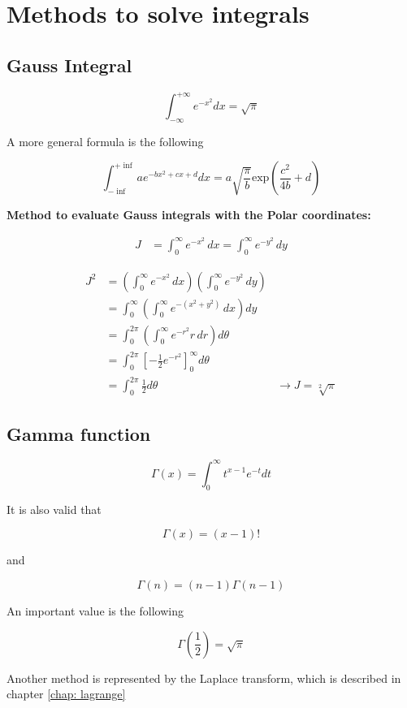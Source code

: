 \section{Methods to solve integrals}

\subsection{Gauss Integral}

\begin{equation}
    \int_{- \infty}^{+ \infty}{e^{-x^2} dx} = \sqrt{\pi}
\end{equation}

A more general formula is the following

\begin{equation}
    \int_{-\inf}^{+\inf}{a e^{-b x^2 + cx + d} dx} = a \sqrt{\frac{\pi}{b}} \text{exp}\left(\frac{c^2}{4b} + d \right)
\end{equation}

\textbf{Method to evaluate Gauss integrals with the Polar coordinates:}

\begin{align*}
    J &= \int_0^\infty e^{-x^2} \, dx = \int_0^\infty e^{-y^2} \, dy
\end{align*}

\begin{align*}
    J^2 &= \left(\int_0^\infty e^{-x^2} \, dx\right) \left(\int_0^\infty e^{-y^2} \, dy\right) \\
        &= \int_0^\infty \left(\int_0^\infty e^{-(x^2 + y^2)} \, dx\right) dy \\
        &= \int_0^{2\pi} \left(\int_0^\infty e^{-r^2} r \, dr\right) d\theta \\
        &= \int_0^{2 \pi}{[-\frac{1}{2} e^{-r^2}]_0^\infty d\theta} \\
        &= \int_0^{2 \pi}{\frac{1}{2} d\theta}
        &\rightarrow J = \sqrt[2]{\pi}
\end{align*}

\subsection{Gamma function}

\[
  \Gamma(x) = \int_0^\infty{t^{x-1} e^{-t} dt}  
\]

It is also valid that

$$
\Gamma(x) = (x-1)!
$$

and

$$
\Gamma(n) = (n-1)\Gamma(n-1)
$$

An important value is the following

$$
\Gamma\left(\frac{1}{2}\right)=\sqrt{\pi}
$$

Another method is represented by the Laplace transform, which is described in chapter \ref{chap: lagrange}